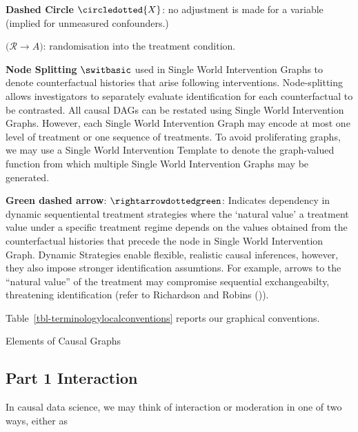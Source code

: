 \documentclass[
  single column]{article}
\begin{document}
\textbf{Dashed Circle} \(\circledotted{X}\): no adjustment is made for a
variable (implied for unmeasured confounders.)

\textbf{\(\big(\mathcal{R} \rightarrow A\big)\)}: randomisation into the
treatment condition.

\textbf{Node Splitting} \(\switbasic\) used in Single World Intervention
Graphs to denote counterfactual histories that arise following
interventions. Node-splitting allows investigators to separately
evaluate identification for each counterfactual to be contrasted. All
causal DAGs can be restated using Single World Intervention Graphs.
However, each Single World Intervention Graph may encode at most one
level of treatment or one sequence of treatments. To avoid proliferating
graphs, we may use a Single World Intervention Template to denote the
graph-valued function from which multiple Single World Intervention
Graphs may be generated.

\textbf{Green dashed arrow}: \(\rightarrowdottedgreen\): Indicates
dependency in dynamic sequentiental treatment strategies where the
`natural value' a treatment value under a specific treatment regime
depends on the values obtained from the counterfactual histories that
precede the node in Single World Intervention Graph. Dynamic Strategies
enable flexible, realistic causal inferences, however, they also impose
stronger identification assumtions. For example, arrows to the ``natural
value'' of the treatment may compromise sequential exchangeabilty,
threatening identification (refer to Richardson and Robins
()).

Table~\ref{tbl-terminologylocalconventions} reports our graphical
conventions.

\begin{table}

\caption{\label{tbl-terminologygeneral}Elements of Causal Graphs}

\centering{

\terminologygeneral

}

\end{table}%

\newpage{}

\subsection{Part 1 Interaction}\label{part-1-interaction}

In causal data science, we may think of interaction or moderation in one
of two ways, either as
\end{document}
